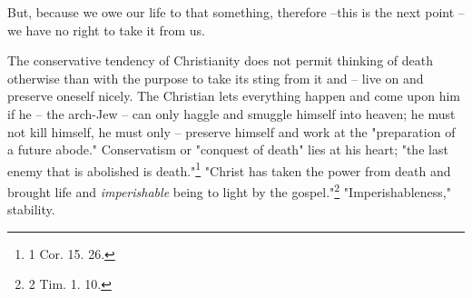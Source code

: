 But, because we owe our life to that something, therefore --this is the next 
point -- we have no right to take it from us.

The conservative tendency of Christianity does not permit thinking of death 
otherwise than with the purpose to take its sting from it and -- live on and 
preserve oneself nicely. The Christian lets everything happen and come upon 
him if he -- the arch-Jew -- can only haggle and smuggle himself into heaven; 
he must not kill himself, he must only -- preserve himself and work at the 
"{}preparation of a future abode."{} Conservatism or "{}conquest of death"{} 
lies at his heart; "{}the last enemy that is abolished is death."{}\footnote{1 
Cor. 15. 26.} "{}Christ has taken the power from death and brought life and 
\textit{imperishable} being to light by the gospel."{}\footnote{2 Tim. 1. 10.} 
"{}Imperishableness,"{} stability.

